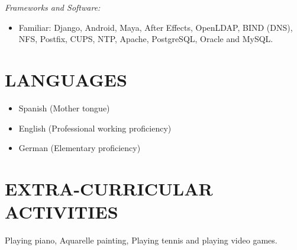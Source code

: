 \documentclass[margin, 10pt]{res} %
\begin{document}
\begin{resume}
{\sl Frameworks and Software:} \\
\begin{itemize} 
\item Familiar: Django, Android, Maya, After Effects, OpenLDAP, BIND (DNS), NFS, Postfix, CUPS, 
    NTP, Apache, PostgreSQL, Oracle and MySQL.
\end{itemize} 


\section{LANGUAGES}

\begin{itemize} 
\item Spanish (Mother tongue)
\item English (Professional working proficiency)
\item German (Elementary proficiency)
\end{itemize} 


\section{EXTRA-CURRICULAR \\ ACTIVITIES} 

Playing piano, Aquarelle painting, Playing tennis and playing video games.


\end{resume}
\end{document}
